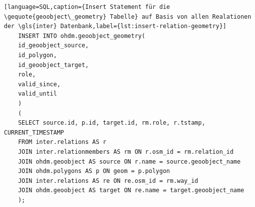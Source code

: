\begin{lstlisting}[language=SQL,caption={Insert Statement für die \gequote{geoobject\_geometry} Tabelle} auf Basis von allen Realationen der \gls{inter} Datenbank,label={lst:insert-relation-geometry}]
	INSERT INTO ohdm.geoobject_geometry(
	id_geoobject_source, 
	id_polygon, 
	id_geoobject_target, 
	role, 
	valid_since, 
	valid_until
	)
	(
	SELECT source.id, p.id, target.id, rm.role, r.tstamp, CURRENT_TIMESTAMP
	FROM inter.relations AS r
	JOIN inter.relationmembers AS rm ON r.osm_id = rm.relation_id
	JOIN ohdm.geoobject AS source ON r.name = source.geoobject_name
	JOIN ohdm.polygons AS p ON geom = p.polygon
	JOIN inter.relations AS re ON re.osm_id = rm.way_id
	JOIN ohdm.geoobject AS target ON re.name = target.geoobject_name
	);
\end{lstlisting}
